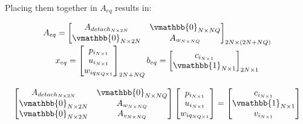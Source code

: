 \documentclass[letterpaper, 10pt, conference]{IEEEtran}
\begin{document}
Placing them together in \(A_{eq}\) results in:

\begin{equation}
\begin{array}{c}
    A_{eq} =
    \begin{bmatrix}
        A_{detach_{N \times 2N}} & \vmathbb{0}_{N \times NQ} \\
        \vmathbb{0}_{N \times 2N} & A_{w_{N \times NQ}}      \\
    \end{bmatrix}_{2N \times (2N + NQ)} \\
    x_{eq} =
    \begin{bmatrix}
        p_{i_{N \times 1}} \\
        u_{i_{N \times 1}} \\
        w_{iq_{NQ \times 1}} \\
    \end{bmatrix}_{2N + NQ}
    b_{eq} =
    \begin{bmatrix}
        c_{i_{N \times 1}} \\
        \vmathbb{1}_{N \times 1} \\
    \end{bmatrix}_{2N \times 1} \\
    \\
    \begin{bmatrix}
        A_{detach_{N \times 2N}}    & \vmathbb{0}_{N \times NQ} \\
        \vmathbb{0}_{N \times 2N} & A_{w_{N \times NQ}}          \\
        \vmathbb{0}_{N \times 2N} & A_{v_{N \times NQ}}          \\
    \end{bmatrix}
    \begin{bmatrix}
        p_{i_{N \times 1}} \\
        u_{i_{N \times 1}} \\
        w_{iq_{NQ \times 1}} \\
    \end{bmatrix}
    =
    \begin{bmatrix}
        c_{i_{N \times 1}} \\
        \vmathbb{1}_{N \times 1} \\
        v_{i_{N \times 1}} \\
    \end{bmatrix}
\end{array}
\end{equation}
\end{document}
